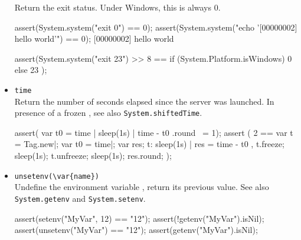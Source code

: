 \begin{itemize}
  Return the exit status.  Under Windows, this is always 0.

\begin{urbiscript}[firstnumber=last]
assert(System.system("exit 0") == 0);
assert(System.system("echo '[00000002] hello world'") == 0);
[00000002] hello world

assert(System.system("exit 23") >> 8
       == { if (System.Platform.isWindows) 0 else 23 });
\end{urbiscript}


\item \lstinline|time|\\
  Return the number of seconds elapsed since the \urbi server was
  launched.  In presence of a frozen , see also
  \lstinline|System.shiftedTime|.
\begin{urbiscript}[firstnumber=last]
assert({ var t0 = time | sleep(1s) | time - t0 }.round ~= 1);
assert (
  2 ==
  {
    var t = Tag.new|;
    var t0 = time|;
    var res;
    t: { sleep(1s) | res = time - t0 },
    t.freeze;
    sleep(1s);
    t.unfreeze;
    sleep(1s);
    res.round;
  });
\end{urbiscript}

\item \lstinline|unsetenv(\var{name})|\\
  Undefine the environment variable , return its previous
  value.  See also \lstinline|System.getenv| and
  \lstinline|System.setenv|.

\begin{urbiscript}[firstnumber=last]
assert(setenv("MyVar", 12) == "12");
assert(!getenv("MyVar").isNil);
assert(unsetenv("MyVar") == "12");
assert(getenv("MyVar").isNil);
\end{urbiscript}


\end{itemize}

